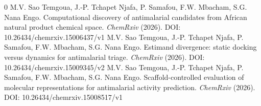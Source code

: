 \documentclass[12pt,a4paper]{article}
\begin{document}
\begingroup
\renewcommand{\section}[2]{}
\begin{thebibliography}{0}
\setlength{\parskip}{0mm}
\setlength{\itemsep}{-0.3mm}
\small
{} M.V. Sao Temgoua, J.-P. Tchapet Njafa, P. Samafou, F.W. Mbacham, S.G. Nana Engo. Computational discovery of antimalarial candidates from African natural product chemical space. \textit{ChemRxiv} (2026). DOI: 10.26434/chemrxiv.15006437/v1
 M.V. Sao Temgoua, J.-P. Tchapet Njafa, P. Samafou, F.W. Mbacham, S.G. Nana Engo. Estimand divergence: static docking versus dynamics for antimalarial triage. \textit{ChemRxiv} (2026). DOI: 10.26434/chemrxiv.15009345/v2
 M.V. Sao Temgoua, J.-P. Tchapet Njafa, P. Samafou, F.W. Mbacham, S.G. Nana Engo. Scaffold-controlled evaluation of molecular representations for antimalarial activity prediction. \textit{ChemRxiv} (2026). DOI: 10.26434/chemrxiv.15008517/v1
\end{thebibliography}
\endgroup
\end{document}
